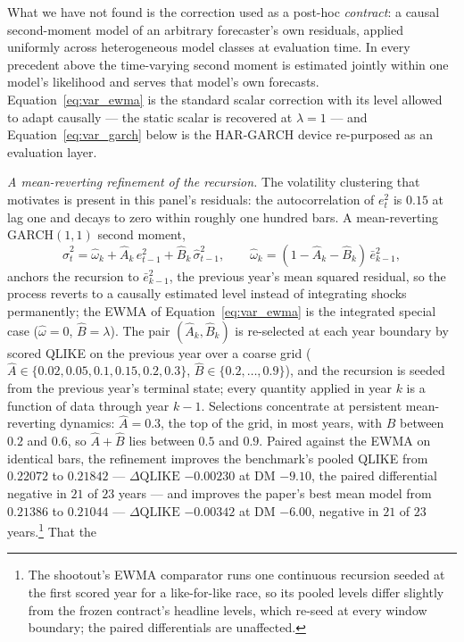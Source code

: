 What we have not found is the correction used as a post-hoc
\emph{contract}: a causal second-moment model of an arbitrary
forecaster's own residuals, applied uniformly across heterogeneous
model classes at evaluation time. In every precedent above the
time-varying second moment is estimated jointly within one model's
likelihood and serves that model's own forecasts.
Equation~\eqref{eq:var_ewma} is the standard scalar correction with
its level allowed to adapt causally --- the static scalar is recovered
at $\lambda = 1$ --- and Equation~\eqref{eq:var_garch} below is the
HAR-GARCH device re-purposed as an evaluation layer.

\emph{A mean-reverting refinement of the recursion.} The volatility
clustering that motivates \citet{CorsiMittnikPigorschPigorsch2008} is
present in this panel's residuals: the autocorrelation of $e_t^2$ is
$0.15$ at lag one and decays to zero within roughly one hundred bars.
A mean-reverting GARCH$(1,1)$ second moment,
\begin{equation}
    \hat{\sigma}^2_t
    = \hat\omega_k + \hat{A}_k\, e_{t-1}^2
      + \hat{B}_k\, \hat{\sigma}^2_{t-1},
    \qquad
    \hat\omega_k = (1 - \hat{A}_k - \hat{B}_k)\,\bar{e}^2_{k-1},
    \label{eq:var_garch}
\end{equation}
anchors the recursion to $\bar{e}^2_{k-1}$, the previous year's mean
squared residual, so the process reverts to a causally estimated level
instead of integrating shocks permanently; the EWMA of
Equation~\eqref{eq:var_ewma} is the integrated special case
($\hat\omega = 0$, $\hat{B} = \lambda$). The pair
$(\hat{A}_k, \hat{B}_k)$ is re-selected at each year boundary by
scored QLIKE on the previous year over a coarse grid
($\hat{A} \in \{0.02, 0.05, 0.1, 0.15, 0.2, 0.3\}$,
$\hat{B} \in \{0.2, \dots, 0.9\}$), and the recursion is seeded from
the previous year's terminal state; every quantity applied in year $k$
is a function of data through year $k-1$. Selections concentrate at
persistent mean-reverting dynamics: $\hat{A} = 0.3$, the top of the
grid, in most years, with $\hat{B}$ between $0.2$ and $0.6$, so
$\hat{A} + \hat{B}$ lies between $0.5$ and $0.9$. Paired against the
EWMA on identical bars, the refinement improves the benchmark's pooled
QLIKE from $0.22072$ to $0.21842$ --- $\Delta\mathrm{QLIKE}$
$-0.00230$ at DM $-9.10$, the paired differential negative in $21$ of
$23$ years --- and improves the paper's best mean model from
$0.21386$ to $0.21044$ --- $\Delta\mathrm{QLIKE}$ $-0.00342$ at DM
$-6.00$, negative in $21$ of $23$ years.\footnote{The shootout's EWMA
comparator runs one continuous recursion seeded at the first scored
year for a like-for-like race, so its pooled levels differ slightly
from the frozen contract's headline levels, which re-seed at every
window boundary; the paired differentials are unaffected.} That the
